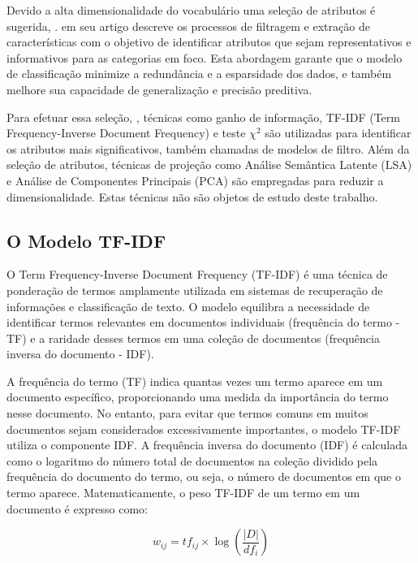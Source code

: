  Devido a alta dimensionalidade do vocabulário uma seleção de atributos é sugerida, \cite{mironczuk2018recent}.  \cite{deng2019feature} em seu artigo descreve os processos de filtragem e extração de características com o objetivo de identificar atributos que sejam representativos e informativos para as categorias em foco. Esta abordagem garante que o modelo de classificação minimize a redundância e a esparsidade dos dados, e também melhore sua capacidade de generalização e precisão preditiva. 
 
Para efetuar essa seleção, \cite{deng2019feature}, técnicas como ganho de informação, TF-IDF (Term Frequency-Inverse Document Frequency) e teste \(\chi^2\) são utilizadas para identificar os atributos mais significativos, também chamadas de modelos de filtro.  Além da seleção de atributos, técnicas de projeção como Análise Semântica Latente (LSA) e Análise de Componentes Principais (PCA) são empregadas para reduzir a dimensionalidade.  Estas técnicas não são objetos de estudo deste trabalho.

\subsection{O Modelo TF-IDF}

O Term Frequency-Inverse Document Frequency (TF-IDF) é uma técnica de ponderação de termos amplamente utilizada em sistemas de recuperação de informações e classificação de texto\cite{baeza2013recuperaccao}. O modelo equilibra a necessidade de identificar termos relevantes em documentos individuais (frequência do termo - TF) e a raridade desses termos em uma coleção de documentos (frequência inversa do documento - IDF).

A frequência do termo (TF) indica quantas vezes um termo aparece em um documento específico, proporcionando uma medida da importância do termo nesse documento. No entanto, para evitar que termos comuns em muitos documentos sejam considerados excessivamente importantes, o modelo TF-IDF utiliza o componente IDF. A frequência inversa do documento (IDF) é calculada como o logaritmo do número total de documentos na coleção dividido pela frequência do documento do termo, ou seja, o número de documentos em que o termo aparece. Matematicamente, o peso TF-IDF de um termo em um documento é expresso como:

\begin{equation}
    w_{ij} = tf_{ij} \times \log\left(\frac{|D|}{df_i}\right)
\end{equation}

